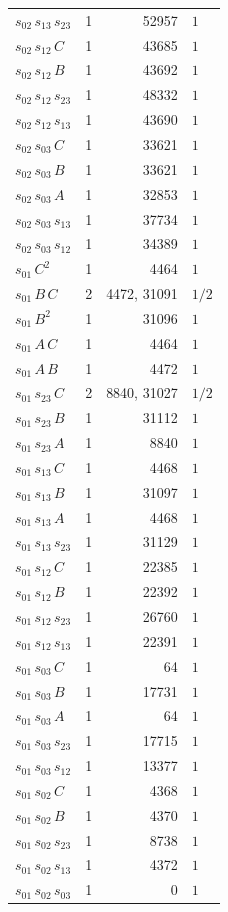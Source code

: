 \begin{longtable}{lrrl}
$s_{02}\,s_{13}\,s_{23}$ & 1 & 52957 & $1$ \\
$s_{02}\,s_{12}\,C$ & 1 & 43685 & $1$ \\
$s_{02}\,s_{12}\,B$ & 1 & 43692 & $1$ \\
$s_{02}\,s_{12}\,s_{23}$ & 1 & 48332 & $1$ \\
$s_{02}\,s_{12}\,s_{13}$ & 1 & 43690 & $1$ \\
$s_{02}\,s_{03}\,C$ & 1 & 33621 & $1$ \\
$s_{02}\,s_{03}\,B$ & 1 & 33621 & $1$ \\
$s_{02}\,s_{03}\,A$ & 1 & 32853 & $1$ \\
$s_{02}\,s_{03}\,s_{13}$ & 1 & 37734 & $1$ \\
$s_{02}\,s_{03}\,s_{12}$ & 1 & 34389 & $1$ \\
$s_{01}\,C^{2}$ & 1 & 4464 & $1$ \\
$s_{01}\,B\,C$ & 2 & 4472, 31091 & $1/2$ \\
$s_{01}\,B^{2}$ & 1 & 31096 & $1$ \\
$s_{01}\,A\,C$ & 1 & 4464 & $1$ \\
$s_{01}\,A\,B$ & 1 & 4472 & $1$ \\
$s_{01}\,s_{23}\,C$ & 2 & 8840, 31027 & $1/2$ \\
$s_{01}\,s_{23}\,B$ & 1 & 31112 & $1$ \\
$s_{01}\,s_{23}\,A$ & 1 & 8840 & $1$ \\
$s_{01}\,s_{13}\,C$ & 1 & 4468 & $1$ \\
$s_{01}\,s_{13}\,B$ & 1 & 31097 & $1$ \\
$s_{01}\,s_{13}\,A$ & 1 & 4468 & $1$ \\
$s_{01}\,s_{13}\,s_{23}$ & 1 & 31129 & $1$ \\
$s_{01}\,s_{12}\,C$ & 1 & 22385 & $1$ \\
$s_{01}\,s_{12}\,B$ & 1 & 22392 & $1$ \\
$s_{01}\,s_{12}\,s_{23}$ & 1 & 26760 & $1$ \\
$s_{01}\,s_{12}\,s_{13}$ & 1 & 22391 & $1$ \\
$s_{01}\,s_{03}\,C$ & 1 & 64 & $1$ \\
$s_{01}\,s_{03}\,B$ & 1 & 17731 & $1$ \\
$s_{01}\,s_{03}\,A$ & 1 & 64 & $1$ \\
$s_{01}\,s_{03}\,s_{23}$ & 1 & 17715 & $1$ \\
$s_{01}\,s_{03}\,s_{12}$ & 1 & 13377 & $1$ \\
$s_{01}\,s_{02}\,C$ & 1 & 4368 & $1$ \\
$s_{01}\,s_{02}\,B$ & 1 & 4370 & $1$ \\
$s_{01}\,s_{02}\,s_{23}$ & 1 & 8738 & $1$ \\
$s_{01}\,s_{02}\,s_{13}$ & 1 & 4372 & $1$ \\
$s_{01}\,s_{02}\,s_{03}$ & 1 & 0 & $1$ \\
\end{longtable}
\endgroup
